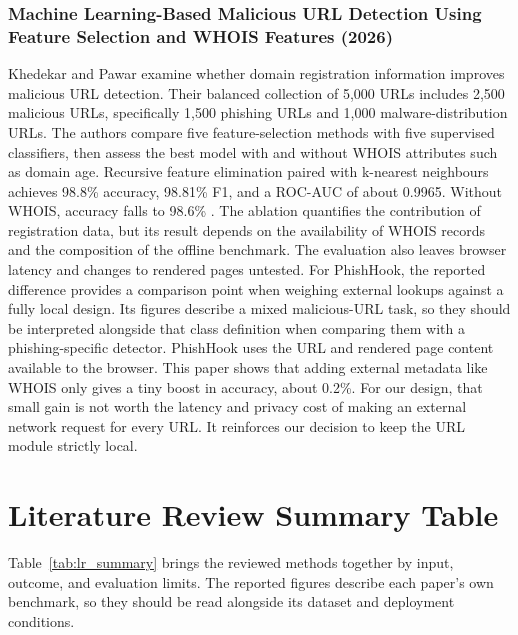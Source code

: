 \documentclass{FastFyp}
\begin{document}
\subsubsection{Machine Learning-Based Malicious URL Detection Using Feature Selection and WHOIS Features (2026)}
Khedekar and Pawar examine whether domain registration information improves malicious URL detection. Their balanced collection of 5,000 URLs includes 2,500 malicious URLs, specifically 1,500 phishing URLs and 1,000 malware-distribution URLs. The authors compare five feature-selection methods with five supervised classifiers, then assess the best model with and without WHOIS attributes such as domain age. Recursive feature elimination paired with k-nearest neighbours achieves 98.8\% accuracy, 98.81\% F1, and a ROC-AUC of about 0.9965. Without WHOIS, accuracy falls to 98.6\% \cite{khedekar2026whoisurls}. The ablation quantifies the contribution of registration data, but its result depends on the availability of WHOIS records and the composition of the offline benchmark. The evaluation also leaves browser latency and changes to rendered pages untested. For PhishHook, the reported difference provides a comparison point when weighing external lookups against a fully local design. Its figures describe a mixed malicious-URL task, so they should be interpreted alongside that class definition when comparing them with a phishing-specific detector. PhishHook uses the URL and rendered page content available to the browser. This paper shows that adding external metadata like WHOIS only gives a tiny boost in accuracy, about 0.2\%. For our design, that small gain is not worth the latency and privacy cost of making an external network request for every URL. It reinforces our decision to keep the URL module strictly local.


\clearpage
\section{Literature Review Summary Table}
\label{sec:lr-summary}
Table~\ref{tab:lr_summary} brings the reviewed methods together by input, outcome, and evaluation limits. The reported figures describe each paper's own benchmark, so they should be read alongside its dataset and deployment conditions.
\end{document}
